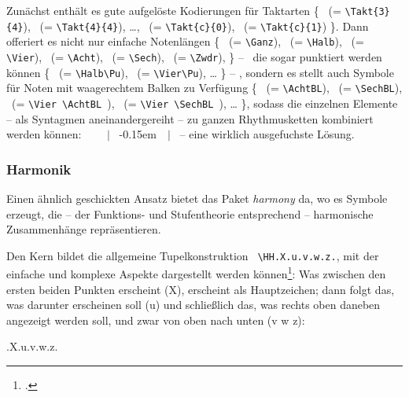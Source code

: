 Zunächst enthält es gute aufgelöste Kodierungen für Taktarten \{ 
 \ (= \texttt{\small \textbackslash{Takt}\{3\}\{4\}}),
 \ (= \texttt{\small \textbackslash{Takt}\{4\}\{4\}}),
\ldots,
 \ (= \texttt{\small \textbackslash{Takt}\{c\}\{0\}}),
 \ (= \texttt{\small \textbackslash{Takt}\{c\}\{1\}})
\}.
Dann offeriert es nicht nur einfache Notenlängen \{
\Ganz \ (= \texttt{\small \textbackslash{Ganz}}),
\Halb \ (= \texttt{\small \textbackslash{Halb}}),
\Vier \ (= \texttt{\small \textbackslash{Vier}}),
\Acht \ (= \texttt{\small \textbackslash{Acht}}),
\Sech \ (= \texttt{\small \textbackslash{Sech}}),
\Zwdr \ (= \texttt{\small \textbackslash{Zwdr}}),
\}  -- \ die sogar punktiert werden können 
\{
\Halb\Pu \ (= \texttt{\small \textbackslash{Halb}\textbackslash{Pu}}),
\Vier\Pu \ (= \texttt{\small \textbackslash{Vier}\textbackslash{Pu}}),
\ldots
\}
-- ,
sondern es stellt auch Symbole für Noten mit waagerechtem Balken zu Verfügung
\{
\AchtBL \ (= \texttt{\small \textbackslash{AchtBL}}),
\SechBL \ (= \texttt{\small \textbackslash{SechBL}}),
\Vier\AchtBL \ (= \texttt{\small \textbackslash{Vier} \textbackslash{AchtBL} }),
\Vier\SechBL \ (= \texttt{\small \textbackslash{Vier} \textbackslash{SechBL} }),
\ldots
\}, 
sodass die einzelnen Elemente -- als Syntagmen aneinandergereiht -- zu ganzen
Rhythmusketten kombiniert werden können:
 \Vier \ \Vier\AchtBL \ \Vier\Pu \ \Acht \ $|$ \AchtBR\Pu \SechBl \
\AchtBR\kern-0.15em\SechBR\Vier \ \SechBr\Vier\SechBl \ $|$ \ -- eine wirklich
ausgefuchste Lösung.

\subsubsection{\small Harmonik}

Einen ähnlich geschickten Ansatz bietet das Paket \textit{harmony} da, wo es
Symbole erzeugt, die -- der Funktions- und Stufentheorie entsprechend --
harmonische Zusammenhänge repräsentieren.

Den Kern bildet die allgemeine Tupelkonstruktion \texttt{\small
\textbackslash{HH.X.u.v.w.z.}}, mit der einfache und komplexe Aspekte
dargestellt werden können\footcite[vgl. dazu][2ff]{WegWeg2007a}: Was zwischen
den ersten beiden Punkten erscheint (X), erscheint als Hauptzeichen; dann folgt
das, was darunter erscheinen soll (u) und schließlich das, was rechts oben
daneben angezeigt werden soll, und zwar von oben nach unten (v w z):

\begin{center}
\HH.X.u.v.w.z.
\end{center}

